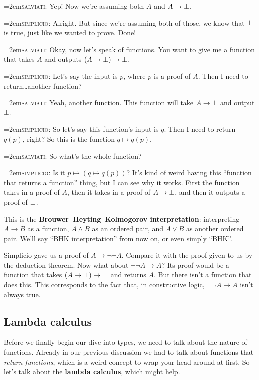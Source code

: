 \documentclass[11pt,paper=letter]{scrartcl}
\renewcommand{\land}{\wedge}
\renewcommand{\lor}{\vee}
\renewcommand{\lnot}{\neg}
\newcommand{\simp}{\vspace{0.5em}\noindent\hangindent=2em\textsc{simplicio:} }
\newcommand{\salv}{\vspace{0.5em}\noindent\hangindent=2em\textsc{salviati:} }
\begin{document}
\salv Yep! Now we're assuming both $A$ and $A \to \bot$.

\simp Alright. But since we're assuming both of those, we know that $\bot$ is true, just like we wanted to prove. Done!

\salv Okay, now let's speak of functions. You want to give me a function that takes $A$ and outputs $(A \to \bot) \to \bot$.

\simp Let's say the input is $p$, where $p$ is a proof of $A$. Then I need to return\dots another function?

\salv Yeah, another function. This function will take $A \to \bot$ and output $\bot$.

\simp So let's say this function's input is $q$. Then I need to return $q(p)$, right? So this is the function $q \mapsto q(p)$.

\salv So what's the whole function?

\simp Is it $p \mapsto (q \mapsto q(p))$? It's kind of weird having this ``function that returns a function'' thing, but I can see why it works. First the function takes in a proof of $A$, then it takes in a proof of $A \to \bot$, and then it outputs a proof of $\bot$.

\vspace{0.5em}

This is the \textbf{Brouwer--Heyting--Kolmogorov interpretation}: interpreting $A \to B$ as a function, $A \land B$ as an ordered pair, and $A \lor B$ as another ordered pair. We'll say ``BHK interpretation'' from now on, or even simply ``BHK''.

Simplicio gave us a proof of $A \to \lnot\lnot A$. Compare it with the proof given to us by the deduction theorem. Now what about $\lnot\lnot A \to A$? Its proof would be a function that takes $(A \to \bot) \to \bot$ and returns $A$. But there isn't a function that does this. This corresponds to the fact that, in constructive logic, $\lnot\lnot A \to A$ isn't always true.

\subsection{Lambda calculus}

Before we finally begin our dive into types, we need to talk about the nature of functions. Already in our previous discussion we had to talk about functions that \emph{return functions}, which is a weird concept to wrap your head around at first. So let's talk about the \textbf{lambda calculus}, which might help.
\end{document}
